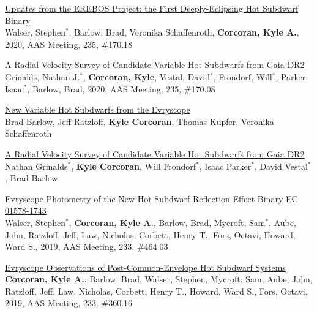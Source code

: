 \documentclass[letterpaper,12pt]{article}
\begin{document}
\begin{etaremune}
\item \href{https://ui.adsabs.harvard.edu/abs/2020AAS...23517018W/abstract}{\textcolor{rotundaorange}{Updates from the EREBOS Project: the First Deeply-Eclipsing Hot Subdwarf Binary}}\\
Walser, Stephen$^{*}$, Barlow, Brad, Veronika Schaffenroth, \textbf{Corcoran, Kyle A.}, 2020, AAS Meeting, 235, \#170.18
\item \href{https://ui.adsabs.harvard.edu/abs/2020AAS...23517008G/abstract}{\textcolor{rotundaorange}{A Radial Velocity Survey of Candidate Variable Hot Subdwarfs from Gaia DR2}}\\
Grinalds, Nathan J.$^{*}$, \textbf{Corcoran, Kyle}, Vestal, David$^{*}$, Frondorf, Will$^{*}$, Parker, Isaac$^{*}$, Barlow, Brad, 2020, AAS Meeting, 235, \#170.08
\item \href{https://sdob9.sciencesconf.org/data/pages/book_sdob9_en_A5_v4.pdf}{\textcolor{rotundaorange}{New Variable Hot Subdwarfs from the Evryscope}}\\
Brad Barlow, Jeff Ratzloff, \textbf{Kyle Corcoran}, Thomas Kupfer, Veronika Schaffenroth
\item \href{https://sdob9.sciencesconf.org/data/pages/book_sdob9_en_A5_v4.pdf}{\textcolor{rotundaorange}{A Radial Velocity Survey of Candidate Variable Hot Subdwarfs from Gaia DR2}}\\
Nathan Grinalds$^{*}$, \textbf{Kyle Corcoran}, Will Frondorf$^{*}$, Isaac Parker$^{*}$, David Vestal$^{*}$, Brad Barlow
\item \href{https://ui.adsabs.harvard.edu/abs/2019AAS...23346403W/abstract}{\textcolor{rotundaorange}{Evryscope Photometry of the New Hot Subdwarf Reflection Effect Binary EC 01578-1743}}\\
Walser, Stephen$^{*}$, \textbf{Corcoran, Kyle A.}, Barlow, Brad, Mycroft, Sam$^{*}$, Aube, John, Ratzloff, Jeff, Law, Nicholas, Corbett, Henry T., Fors, Octavi, Howard, Ward S., 2019, AAS Meeting, 233, \#464.03
\item \href{https://ui.adsabs.harvard.edu/abs/2019AAS...23336016C/abstract}{\textcolor{rotundaorange}{Evryscope Observations of Post-Common-Envelope Hot Subdwarf Systems}}\\
\textbf{Corcoran, Kyle A.}, Barlow, Brad, Walser, Stephen, Mycroft, Sam, Aube, John, Ratzloff, Jeff, Law, Nicholas, Corbett, Henry T., Howard, Ward S., Fors, Octavi, 2019, AAS Meeting, 233, \#360.16

\end{etaremune}
\end{document}

